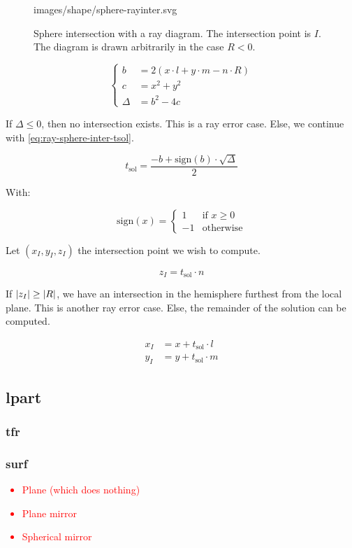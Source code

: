 \begin{figure} \caption{\label{fig:sphere-inter} Sphere intersection with
a ray diagram. The intersection point is $I$. The diagram is drawn arbitrarily
in the case $R<0$.}

           {images/shape/sphere-rayinter.svg}
\end{figure}

\begin{equation} \label{eq:ray-sphere-inter1}
\begin{cases}
b &= 2 (x \cdot l + y \cdot m - n \cdot R) \\
c &= x^2 + y^2 \\
\Delta &= b^2 - 4 c
\end{cases}
\end{equation}

If $\Delta \leq 0$, then no intersection exists. This is a ray error case.
Else, we continue with \cref{eq:ray-sphere-inter-tsol}.

\begin{equation} \label{eq:ray-sphere-inter-tsol}
t_\textrm{sol} = \frac{-b + \textrm{sign}(b) \cdot \sqrt{\Delta}}{2}
\end{equation}

With:

\begin{equation}
\textrm{sign}(x) = \begin{cases}
1 & \text{if } x \geq 0 \\
-1 & \text{otherwise}
\end{cases}
\end{equation}

Let $(x_I, y_I, z_I)$ the intersection point we wish to compute.

\begin{equation}
z_I = t_\textrm{sol} \cdot n
\end{equation}

If $\abs{z_I} \geq \abs{R}$, we have an intersection in the hemisphere furthest
from the local plane. This is another ray error case. Else, the remainder of
the solution can be computed.

\begin{equation}
\begin{aligned}
x_I &= x + t_\textrm{sol} \cdot l \\
y_I &= y + t_\textrm{sol} \cdot m
\end{aligned}
\end{equation}

\subsection{lpart}

\subsubsection{tfr}

\subsubsection{surf}
\textcolor{red}{
\begin{itemize}
\item Plane (which does nothing)
\item Plane mirror
\item Spherical mirror
\end{itemize}}

